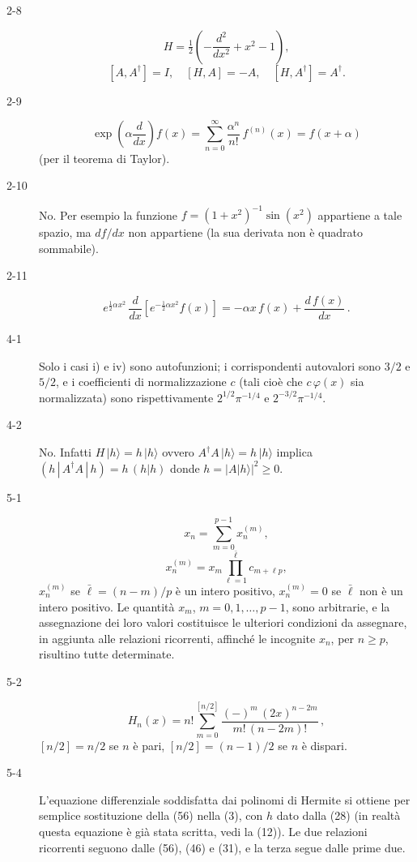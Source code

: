 \documentclass[11pt, a4paper]{book}
\numberwithin{equation}{section}
\begin{document}
\begin{description}
\item[2-8]
\[
  H = \tfrac{1}{2}\!\left(-\frac{d^2}{dx^2} + x^2 - 1\right),
\]
\[
  [A, A^\dagger] = I,\quad [H, A] = -A,\quad [H, A^\dagger] = A^\dagger.
\]

\item[2-9]
\[
  \exp\!\left(\alpha\frac{d}{dx}\right) f(x)
  = \sum_{n=0}^{\infty} \frac{\alpha^n}{n!}\, f^{(n)}(x)
  = f(x + \alpha)
\]
(per il teorema di Taylor).

\item[2-10] No. Per esempio la funzione $f = (1+x^2)^{-1}\sin(x^2)$ appartiene a tale spazio, ma $df/dx$ non appartiene (la sua derivata non è quadrato sommabile).

\item[2-11]
\[
  e^{\frac{1}{2}\alpha x^2}\,\frac{d}{dx}\!\left[e^{-\frac{1}{2}\alpha x^2} f(x)\right]
  = -\alpha x\, f(x) + \frac{d\,f(x)}{dx}\,.
\]

\item[4-1] Solo i casi i) e iv) sono autofunzioni; i corrispondenti autovalori sono $3/2$ e $5/2$, e i coefficienti di normalizzazione $c$ (tali cioè che $c\,\varphi(x)$ sia normalizzata) sono rispettivamente $2^{1/2}\pi^{-1/4}$ e $2^{-3/2}\pi^{-1/4}$.

\item[4-2] No. Infatti $H\,|h\rangle = h\,|h\rangle$ ovvero $A^\dagger A\,|h\rangle = h\,|h\rangle$ implica $(h\,|\,A^\dagger A\,|\,h) = h\,(h|h)$ donde $h = |A|h\rangle|^2 \geq 0$.

\item[5-1]
\[
  x_n = \sum_{m=0}^{p-1} x_n^{(m)},
\]
\[
  x_n^{(m)} = x_m \prod_{\ell=1}^{\bar{\ell}} c_{m+\ell p},
\]
$x_n^{(m)}$ se $\bar{\ell} = (n-m)/p$ è un intero positivo, $x_n^{(m)} = 0$ se $\bar{\ell}$ non è un intero positivo. Le quantità $x_m$, $m=0,1,\ldots,p-1$, sono arbitrarie, e la assegnazione dei loro valori costituisce le ulteriori condizioni da assegnare, in aggiunta alle relazioni ricorrenti, affinché le incognite $x_n$, per $n \geq p$, risultino tutte determinate.

\item[5-2]
\[
  H_n(x) = n!\sum_{m=0}^{[n/2]} \frac{(-)^m\,(2x)^{n-2m}}{m!\,(n-2m)!}\,,
\]
$[n/2] = n/2$ se $n$ è pari, $[n/2]=(n-1)/2$ se $n$ è dispari.

\item[5-4] L'equazione differenziale soddisfatta dai polinomi di Hermite si ottiene per semplice sostituzione della (56) nella (3), con $h$ dato dalla (28) (in realtà questa equazione è già stata scritta, vedi la (12)). Le due relazioni ricorrenti seguono dalle (56), (46) e (31), e la terza segue dalle prime due.


\end{description}
\end{document}
